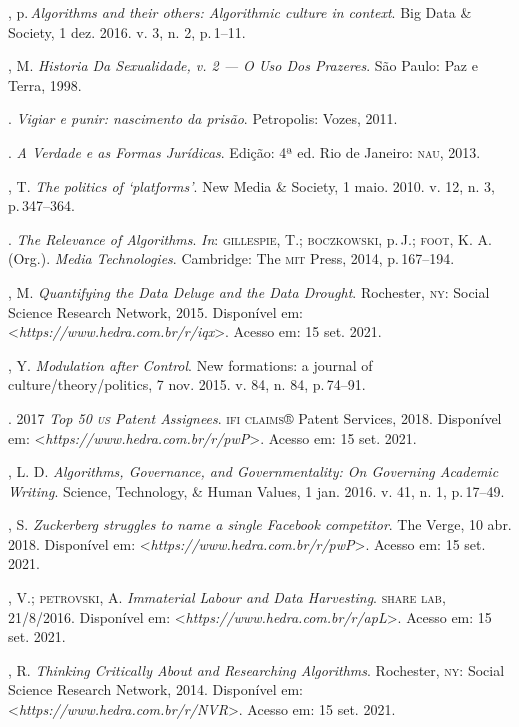 \begin{bibliohedra}
, p.\,\emph{Algorithms and their others: Algorithmic culture in
context}. Big Data \& Society, 1 dez. 2016. v. 3, n. 2, p.\,1--11.

, M. \emph{Historia Da Sexualidade, v. 2 --- O Uso Dos Prazeres}.
São Paulo: Paz e Terra, 1998.

\titidem. \emph{Vigiar e punir: nascimento da prisão}. Petropolis:
Vozes, 2011.

\titidem. \emph{A Verdade e as Formas Jurídicas}. Edição:
4ª ed. Rio de Janeiro: \textsc{nau}, 2013.

, T. \emph{The politics of `platforms'}. New Media \&
Society, 1 maio. 2010. v. 12, n. 3, p.\,347--364.

\titidem. \emph{The Relevance of Algorithms}. \emph{In}:
\textsc{gillespie}, T.; \textsc{boczkowski}, p.\,J.; \textsc{foot}, K. A. (Org.). \emph{Media
Technologies}. Cambridge: The \textsc{mit} Press, 2014, p.\,167--194.

, M. \emph{Quantifying the Data Deluge and the Data Drought}.
Rochester, \textsc{ny}: Social Science Research Network, 2015. Disponível em:
\textless{}\emph{https://www.hedra.com.br/r/iqx}\textgreater{}. Acesso em: 15 set. 2021.

, Y. \emph{Modulation after Control}. New formations: a journal of
culture/theory/politics, 7 nov. 2015. v. 84, n. 84, p.\,74--91.

. 2017 \emph{Top 50 \textsc{us} Patent Assignees}. \textsc{ifi claims}® Patent
Services, 2018. Disponível em: \textless{}\emph{https://www.hedra.com.br/r/pwP}\textgreater{}. Acesso em: 15 set. 2021.

, L. D. \emph{Algorithms, Governance, and Governmentality: On
Governing Academic Writing}. Science, Technology, \& Human
Values, 1 jan. 2016. v. 41, n. 1, p.\,17--49.

, S. \emph{Zuckerberg struggles to name a single Facebook
competitor}. The Verge, 10 abr. 2018. Disponível em: \textless{}\emph{https://www.hedra.com.br/r/pwP}\textgreater{}. Acesso em: 15 set. 2021.

, V.; \textsc{petrovski}, A. \emph{Immaterial Labour and Data Harvesting}.
\textsc{share lab}, 21/8/2016. Disponível em: \textless{}\emph{https://www.hedra.com.br/r/apL}\textgreater{}. Acesso em: 15 set. 2021.

, R. \emph{Thinking Critically About and Researching
Algorithms}. Rochester, \textsc{ny}: Social Science Research Network, 2014.
Disponível em: \textless{}\emph{https://www.hedra.com.br/r/NVR}\textgreater{}. Acesso em: 15 set. 2021.


\end{bibliohedra}
